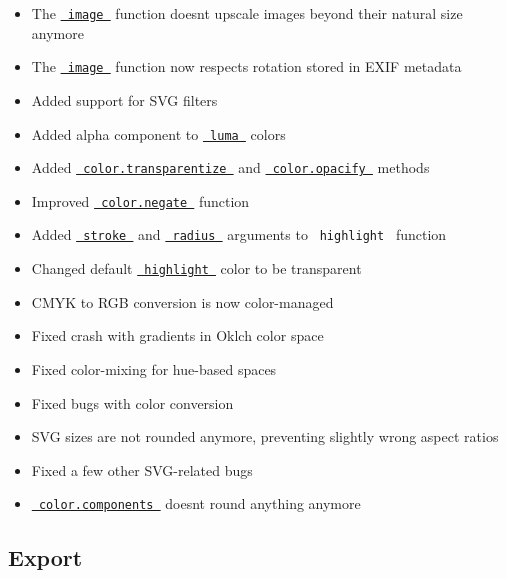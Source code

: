\begin{itemize}
\tightlist
\item
  The \href{/docs/reference/visualize/image/}{\texttt{\ image\ }}
  function doesn\textquotesingle t upscale images beyond their natural
  size anymore
\item
  The \href{/docs/reference/visualize/image/}{\texttt{\ image\ }}
  function now respects rotation stored in EXIF metadata
\item
  Added support for SVG filters
\item
  Added alpha component to
  \href{/docs/reference/visualize/color/\#definitions-luma}{\texttt{\ luma\ }}
  colors
\item
  Added
  \href{/docs/reference/visualize/color/\#definitions-transparentize}{\texttt{\ color.transparentize\ }}
  and
  \href{/docs/reference/visualize/color/\#definitions-opacify}{\texttt{\ color.opacify\ }}
  methods
\item
  Improved
  \href{/docs/reference/visualize/color/\#definitions-negate}{\texttt{\ color.negate\ }}
  function
\item
  Added
  \href{/docs/reference/text/highlight/\#parameters-stroke}{\texttt{\ stroke\ }}
  and
  \href{/docs/reference/text/highlight/\#parameters-radius}{\texttt{\ radius\ }}
  arguments to \texttt{\ highlight\ } function
\item
  Changed default
  \href{/docs/reference/text/highlight/}{\texttt{\ highlight\ }} color
  to be transparent
\item
  CMYK to RGB conversion is now color-managed
\item
  Fixed crash with gradients in Oklch color space
\item
  Fixed color-mixing for hue-based spaces
\item
  Fixed bugs with color conversion
\item
  SVG sizes are not rounded anymore, preventing slightly wrong aspect
  ratios
\item
  Fixed a few other SVG-related bugs
\item
  \href{/docs/reference/visualize/color/\#definitions-components}{\texttt{\ color.components\ }}
  doesn\textquotesingle t round anything anymore
\end{itemize}

\subsection{Export}\label{export}

